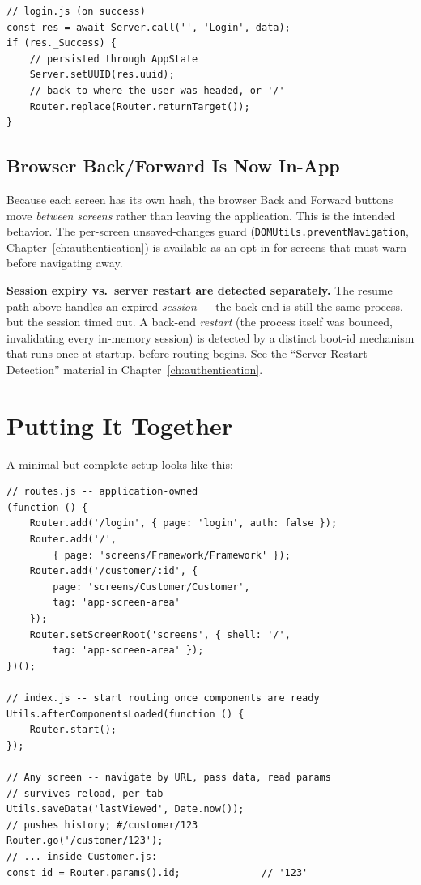 \begin{lstlisting}[style=javascript]
// login.js (on success)
const res = await Server.call('', 'Login', data);
if (res._Success) {
    // persisted through AppState
    Server.setUUID(res.uuid);
    // back to where the user was headed, or '/'
    Router.replace(Router.returnTarget());
}
\end{lstlisting}

\subsection{Browser Back/Forward Is Now In-App}
\label{sec:rs-resume-back}

Because each screen has its own hash, the browser Back and Forward buttons move \emph{between screens} rather than leaving the application.  This is the intended behavior.  The per-screen unsaved-changes guard (\texttt{DOMUtils.preventNavigation}, Chapter~\ref{ch:authentication}) is available as an opt-in for screens that must warn before navigating away.

\begin{notebox}
\textbf{Session expiry vs.\ server restart are detected separately.}  The resume path above handles an expired \emph{session} --- the back end is still the same process, but the session timed out.  A back-end \emph{restart} (the process itself was bounced, invalidating every in-memory session) is detected by a distinct boot-id mechanism that runs once at startup, before routing begins.  See the ``Server-Restart Detection'' material in Chapter~\ref{ch:authentication}.
\end{notebox}

\section{Putting It Together}
\label{sec:rs-together}

A minimal but complete setup looks like this:

\begin{lstlisting}[style=javascript]
// routes.js -- application-owned
(function () {
    Router.add('/login', { page: 'login', auth: false });
    Router.add('/',
        { page: 'screens/Framework/Framework' });
    Router.add('/customer/:id', {
        page: 'screens/Customer/Customer',
        tag: 'app-screen-area'
    });
    Router.setScreenRoot('screens', { shell: '/',
        tag: 'app-screen-area' });
})();

// index.js -- start routing once components are ready
Utils.afterComponentsLoaded(function () {
    Router.start();
});

// Any screen -- navigate by URL, pass data, read params
// survives reload, per-tab
Utils.saveData('lastViewed', Date.now());
// pushes history; #/customer/123
Router.go('/customer/123');
// ... inside Customer.js:
const id = Router.params().id;              // '123'
\end{lstlisting}

